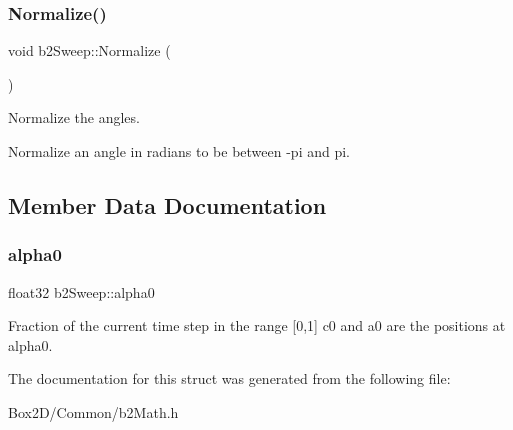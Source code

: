 \subsubsection{\texorpdfstring{Normalize()}{Normalize()}}
{\footnotesize\ttfamily void b2\+Sweep\+::\+Normalize (\begin{DoxyParamCaption}{ }\end{DoxyParamCaption})\hspace{0.3cm}{\ttfamily [inline]}}



Normalize the angles. 

Normalize an angle in radians to be between -\/pi and pi. 

\subsection{Member Data Documentation}
\mbox{\label{structb2_sweep_aa5f8ab90178b58bc0777096cbc6b91cf}} 
\subsubsection{\texorpdfstring{alpha0}{alpha0}}
{\footnotesize\ttfamily float32 b2\+Sweep\+::alpha0}

Fraction of the current time step in the range \mbox{[}0,1\mbox{]} c0 and a0 are the positions at alpha0. 

The documentation for this struct was generated from the following file\+:\begin{DoxyCompactItemize}
\item 
Box2\+D/\+Common/b2\+Math.\+h\end{DoxyCompactItemize}
